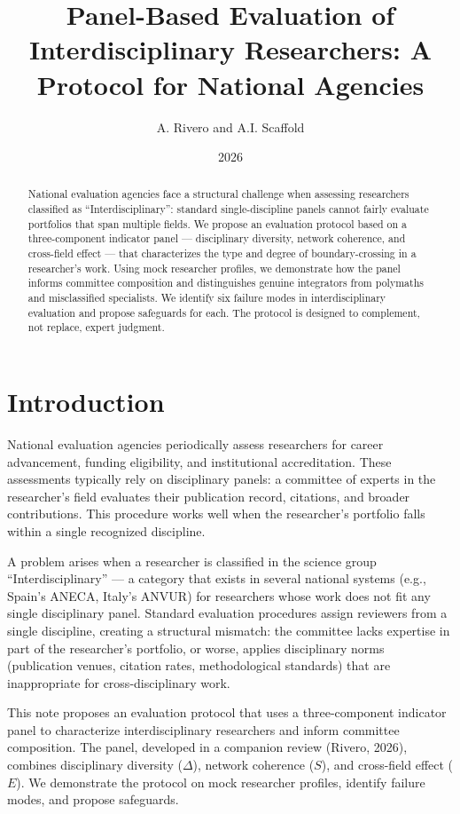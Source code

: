 \documentclass[
]{article}
\title{Panel-Based Evaluation of Interdisciplinary Researchers: A
Protocol for National Agencies}
\author{A. Rivero and A.I. Scaffold}
\date{2026}
\begin{document}
\maketitle
\begin{abstract}
National evaluation agencies face a structural challenge when assessing
researchers classified as ``Interdisciplinary'': standard
single-discipline panels cannot fairly evaluate portfolios that span
multiple fields. We propose an evaluation protocol based on a
three-component indicator panel --- disciplinary diversity, network
coherence, and cross-field effect --- that characterizes the type and
degree of boundary-crossing in a researcher's work. Using mock
researcher profiles, we demonstrate how the panel informs committee
composition and distinguishes genuine integrators from polymaths and
misclassified specialists. We identify six failure modes in
interdisciplinary evaluation and propose safeguards for each. The
protocol is designed to complement, not replace, expert judgment.
\end{abstract}

\hypertarget{introduction}{%
\section{Introduction}\label{introduction}}

National evaluation agencies periodically assess researchers for career
advancement, funding eligibility, and institutional accreditation. These
assessments typically rely on disciplinary panels: a committee of
experts in the researcher's field evaluates their publication record,
citations, and broader contributions. This procedure works well when the
researcher's portfolio falls within a single recognized discipline.

A problem arises when a researcher is classified in the science group
``Interdisciplinary'' --- a category that exists in several national
systems (e.g., Spain's ANECA, Italy's ANVUR) for researchers whose work
does not fit any single disciplinary panel. Standard evaluation
procedures assign reviewers from a single discipline, creating a
structural mismatch: the committee lacks expertise in part of the
researcher's portfolio, or worse, applies disciplinary norms
(publication venues, citation rates, methodological standards) that are
inappropriate for cross-disciplinary work.

This note proposes an evaluation protocol that uses a three-component
indicator panel to characterize interdisciplinary researchers and inform
committee composition. The panel, developed in a companion review
(Rivero, 2026), combines disciplinary diversity (\(\Delta\)), network
coherence (\(S\)), and cross-field effect (\(E\)). We demonstrate the
protocol on mock researcher profiles, identify failure modes, and
propose safeguards.
\end{document}
